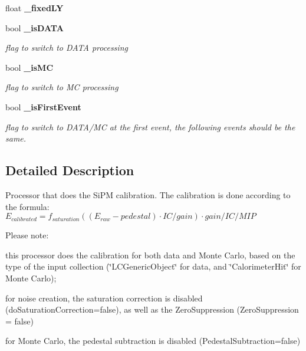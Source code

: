 \begin{DoxyCompactItemize}
\item 
float {\bfseries \_\-fixedLY}\label{classCALICE_1_1SiPMCalibrateProcessor_a29bf0f8380c4f017874bc0dad44d8a00}

\item 
bool {\bf \_\-isDATA}\label{classCALICE_1_1SiPMCalibrateProcessor_a470adc298f88f9e78ae24aa67be702d3}

\begin{DoxyCompactList}\small\item\em flag to switch to DATA processing \item\end{DoxyCompactList}\item 
bool {\bf \_\-isMC}\label{classCALICE_1_1SiPMCalibrateProcessor_aa6bcd2af91b68af922b9b34224a0d8b1}

\begin{DoxyCompactList}\small\item\em flag to switch to MC processing \item\end{DoxyCompactList}\item 
bool {\bf \_\-isFirstEvent}
\begin{DoxyCompactList}\small\item\em flag to switch to DATA/MC at the first event, the following events should be the same. \item\end{DoxyCompactList}\end{DoxyCompactItemize}


\subsection{Detailed Description}
Processor that does the SiPM calibration. The calibration is done according to the formula: $E_{calibrated}=f_{saturation}((E_{raw}-pedestal) \cdot IC/gain) \cdot gain/IC/MIP$

Please note:
\begin{DoxyItemize}
\item this processor does the calibration for both data and Monte Carlo, based on the type of the input collection (\char`\"{}LCGenericObject\char`\"{} for data, and \char`\"{}CalorimeterHit\char`\"{} for Monte Carlo);
\item for noise creation, the saturation correction is disabled (doSaturationCorrection=false), as well as the ZeroSuppression (ZeroSuppression = false)
\item for Monte Carlo, the pedestal subtraction is disabled (PedestalSubtraction=false)
\end{DoxyItemize}

